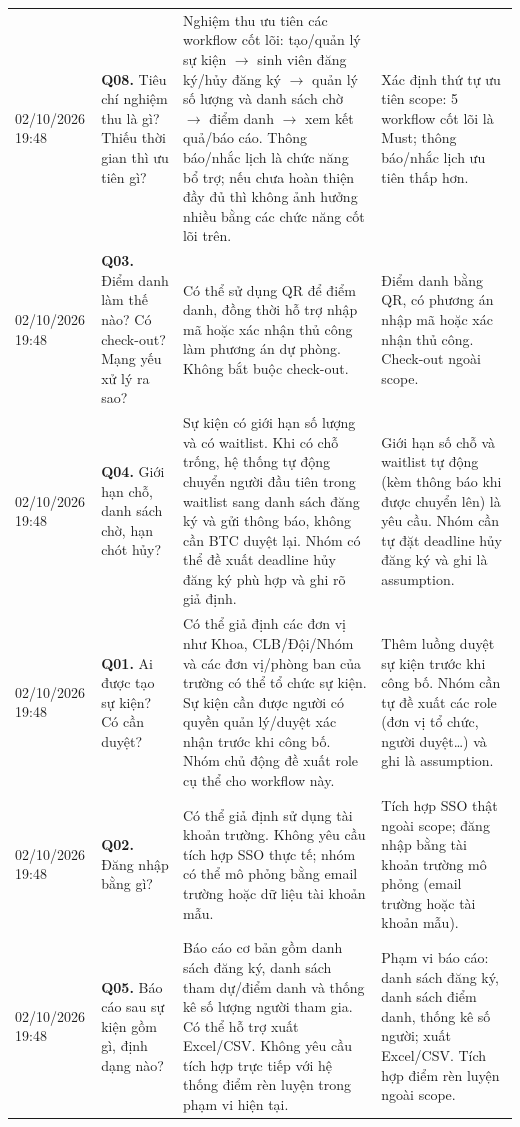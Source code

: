 \begin{landscape}
\begin{longtable}{L{2.08cm}L{7.22cm}L{6.32cm}L{4.70cm}}
02/10/2026 19:48 & \textbf{Q08.} Tiêu chí nghiệm thu là gì? Thiếu thời gian thì ưu tiên gì? & Nghiệm thu ưu tiên các workflow cốt lõi: tạo/quản lý sự kiện $\rightarrow$ sinh viên đăng ký/hủy đăng ký $\rightarrow$ quản lý số lượng và danh sách chờ $\rightarrow$ điểm danh $\rightarrow$ xem kết quả/báo cáo. Thông báo/nhắc lịch là chức năng bổ trợ; nếu chưa hoàn thiện đầy đủ thì không ảnh hưởng nhiều bằng các chức năng cốt lõi trên. & Xác định thứ tự ưu tiên scope: 5 workflow cốt lõi là Must; thông báo/nhắc lịch ưu tiên thấp hơn. \\
02/10/2026 19:48 & \textbf{Q03.} Điểm danh làm thế nào? Có check-out? Mạng yếu xử lý ra sao? & Có thể sử dụng QR để điểm danh, đồng thời hỗ trợ nhập mã hoặc xác nhận thủ công làm phương án dự phòng. Không bắt buộc check-out. & Điểm danh bằng QR, có phương án nhập mã hoặc xác nhận thủ công. Check-out ngoài scope. \\
02/10/2026 19:48 & \textbf{Q04.} Giới hạn chỗ, danh sách chờ, hạn chót hủy? & Sự kiện có giới hạn số lượng và có waitlist. Khi có chỗ trống, hệ thống tự động chuyển người đầu tiên trong waitlist sang danh sách đăng ký và gửi thông báo, không cần BTC duyệt lại. Nhóm có thể đề xuất deadline hủy đăng ký phù hợp và ghi rõ giả định. & Giới hạn số chỗ và waitlist tự động (kèm thông báo khi được chuyển lên) là yêu cầu. Nhóm cần tự đặt deadline hủy đăng ký và ghi là assumption. \\
02/10/2026 19:48 & \textbf{Q01.} Ai được tạo sự kiện? Có cần duyệt? & Có thể giả định các đơn vị như Khoa, CLB/Đội/Nhóm và các đơn vị/phòng ban của trường có thể tổ chức sự kiện. Sự kiện cần được người có quyền quản lý/duyệt xác nhận trước khi công bố. Nhóm chủ động đề xuất role cụ thể cho workflow này. & Thêm luồng duyệt sự kiện trước khi công bố. Nhóm cần tự đề xuất các role (đơn vị tổ chức, người duyệt\ldots) và ghi là assumption. \\
02/10/2026 19:48 & \textbf{Q02.} Đăng nhập bằng gì? & Có thể giả định sử dụng tài khoản trường. Không yêu cầu tích hợp SSO thực tế; nhóm có thể mô phỏng bằng email trường hoặc dữ liệu tài khoản mẫu. & Tích hợp SSO thật ngoài scope; đăng nhập bằng tài khoản trường mô phỏng (email trường hoặc tài khoản mẫu). \\
02/10/2026 19:48 & \textbf{Q05.} Báo cáo sau sự kiện gồm gì, định dạng nào? & Báo cáo cơ bản gồm danh sách đăng ký, danh sách tham dự/điểm danh và thống kê số lượng người tham gia. Có thể hỗ trợ xuất Excel/CSV. Không yêu cầu tích hợp trực tiếp với hệ thống điểm rèn luyện trong phạm vi hiện tại. & Phạm vi báo cáo: danh sách đăng ký, danh sách điểm danh, thống kê số người; xuất Excel/CSV. Tích hợp điểm rèn luyện ngoài scope. \\

\end{longtable}
\end{landscape}

